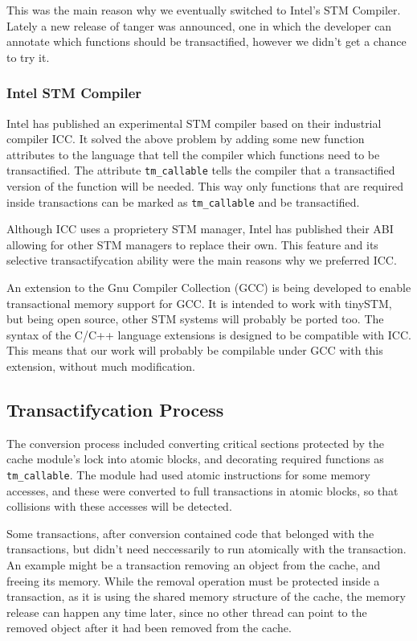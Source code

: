 \documentclass[preprint,natbib,11pt]{sigplanconf}
\begin{document}
This was the main reason why we eventually switched to Intel's STM Compiler.
Lately a new release of tanger was announced, one in which the developer can
annotate which functions should be transactified, however we didn't get a chance
to try it.

\subsubsection{Intel STM Compiler}
Intel has published\cite{icc} an experimental STM compiler based on their industrial
compiler ICC. It solved the above problem by adding some new function attributes
to the language that tell the compiler which functions need to be transactified.
The attribute {\tt tm\_callable} tells the compiler that a transactified version
of the function will be needed. This way only functions that are required inside
transactions can be marked as {\tt tm\_callable} and be transactified.

Although ICC uses a proprietery STM manager, Intel has published their
ABI\cite{icc:abi} allowing for other STM managers to replace their own. This feature
and its selective transactifycation ability were the main reasons why we
preferred ICC.

An extension to the Gnu Compiler Collection (GCC) is being developed\cite{gcctm} to
enable transactional memory support for GCC. It is intended to work with
tinySTM, but being open source, other STM systems will probably be ported too.
The syntax of the C/C++ language extensions is designed to be compatible with
ICC. This means that our work will probably be compilable under GCC with this
extension, without much modification.

\subsection{Transactifycation Process} 
The conversion process included
converting critical sections protected by the cache module's lock into atomic
blocks, and decorating required functions as {\tt tm\_callable}. The module had
used atomic instructions for some memory accesses, and these were converted to
full transactions in atomic blocks, so that collisions with these accesses will
be detected.

Some transactions, after conversion contained code that belonged with the
transactions, but didn't need neccessarily to run atomically with the
transaction. An example might be a transaction removing an object from the
cache, and freeing its memory. While the removal operation must be protected
inside a transaction, as it is using the shared memory structure of the cache,
the memory release can happen any time later, since no other thread can point to
the removed object after it had been removed from the cache. 
\end{document}
